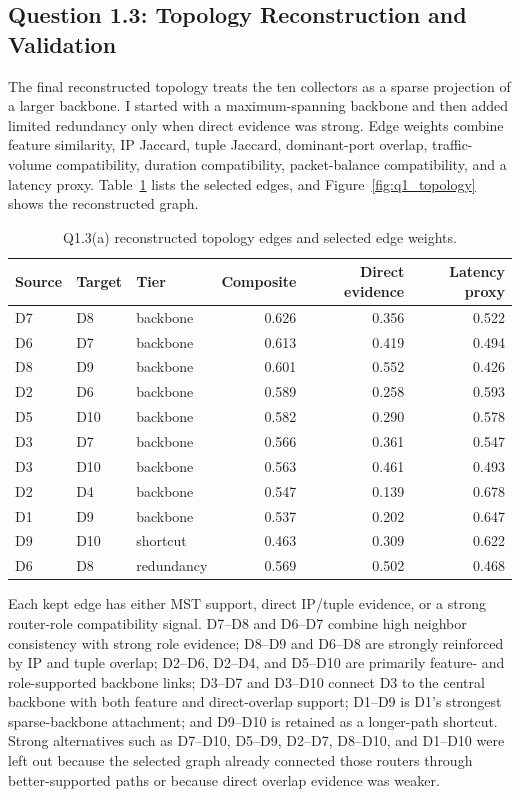 \documentclass[journal,onecolumn]{IEEEtran}
\begin{document}
\subsection{Question 1.3: Topology Reconstruction and Validation}
The final reconstructed topology treats the ten collectors as a sparse projection of a larger backbone. I started with a maximum-spanning backbone and then added limited redundancy only when direct evidence was strong. Edge weights combine feature similarity, IP Jaccard, tuple Jaccard, dominant-port overlap, traffic-volume compatibility, duration compatibility, packet-balance compatibility, and a latency proxy. Table~\ref{tab:q1_edges} lists the selected edges, and Figure~\ref{fig:q1_topology} shows the reconstructed graph.

\begin{table}[!t]
\caption{Q1.3(a) reconstructed topology edges and selected edge weights.}
\label{tab:q1_edges}
\centering
\scriptsize
\begin{tabular}{@{}lllrrr@{}}
\toprule
Source & Target & Tier & Composite & Direct evidence & Latency proxy \\
\midrule
D7 & D8 & backbone & 0.626 & 0.356 & 0.522 \\
D6 & D7 & backbone & 0.613 & 0.419 & 0.494 \\
D8 & D9 & backbone & 0.601 & 0.552 & 0.426 \\
D2 & D6 & backbone & 0.589 & 0.258 & 0.593 \\
D5 & D10 & backbone & 0.582 & 0.290 & 0.578 \\
D3 & D7 & backbone & 0.566 & 0.361 & 0.547 \\
D3 & D10 & backbone & 0.563 & 0.461 & 0.493 \\
D2 & D4 & backbone & 0.547 & 0.139 & 0.678 \\
D1 & D9 & backbone & 0.537 & 0.202 & 0.647 \\
D9 & D10 & shortcut & 0.463 & 0.309 & 0.622 \\
D6 & D8 & redundancy & 0.569 & 0.502 & 0.468 \\
\bottomrule
\end{tabular}
\end{table}

Each kept edge has either MST support, direct IP/tuple evidence, or a strong router-role compatibility signal. D7--D8 and D6--D7 combine high neighbor consistency with strong role evidence; D8--D9 and D6--D8 are strongly reinforced by IP and tuple overlap; D2--D6, D2--D4, and D5--D10 are primarily feature- and role-supported backbone links; D3--D7 and D3--D10 connect D3 to the central backbone with both feature and direct-overlap support; D1--D9 is D1's strongest sparse-backbone attachment; and D9--D10 is retained as a longer-path shortcut. Strong alternatives such as D7--D10, D5--D9, D2--D7, D8--D10, and D1--D10 were left out because the selected graph already connected those routers through better-supported paths or because direct overlap evidence was weaker.
\end{document}

